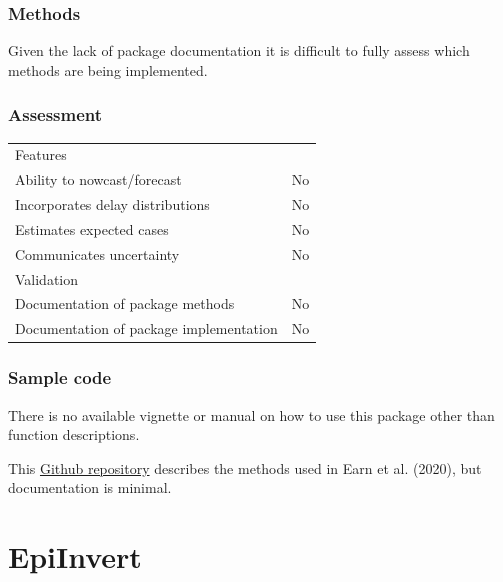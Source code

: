 \documentclass[
  letterpaper,
  DIV=11,
  numbers=noendperiod]{scrreprt}
\begin{document}
\subsection*{Methods}\label{methods-5}

Given the lack of package documentation it is difficult to fully assess
which methods are being implemented.

\subsection*{Assessment}\label{assessment-5}

\begin{longtable}[]{@{}
  >{\raggedright\arraybackslash}p{}
  >{\raggedright\arraybackslash}p{}@{}}
\toprule\noalign{}
\endhead
\bottomrule\noalign{}
\endlastfoot
Features & \\
Ability to nowcast/forecast & No \\
Incorporates delay distributions & No \\
Estimates expected cases & No \\
Communicates uncertainty & No \\
Validation & \\
Documentation of package methods & No \\
Documentation of package implementation & No \\
\end{longtable}

\subsection*{Sample code}\label{sample-code-5}

There is no available vignette or manual on how to use this package
other than function descriptions.

This \href{https://github.com/davidearn/plague_growth}{Github
repository} describes the methods used in Earn et al. (2020), but
documentation is minimal.

\chapter*{EpiInvert}\label{epiinvert}
\end{document}
